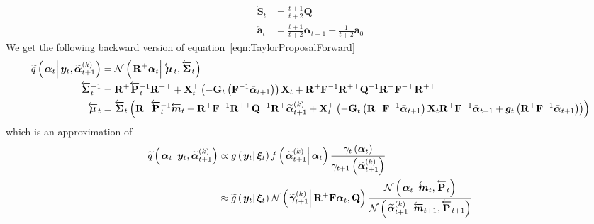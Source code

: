 \documentclass[9pt, notitlepage]{article}
\renewcommand{\vec}[1]{\bm{#1}}
\newcommand{\vecb}[1]{\bar{\vec{#1}}}
\newcommand{\vecLarrow}[1]{\overleftarrow{\vec{#1}}}
\newcommand{\mat}[1]{\mathbf{#1}}
\newcommand{\matLarrow}[1]{\overleftarrow{\mat{#1}}}
\newcommand{\Lparen}[1]{\left( #1\right)}
\newcommand{\Cond}[2]{\left. #1 \vphantom{#2} \right\vert  #2}
\newcommand{\optor}[2]{#1\Lparen{#2}}
\newcommand{\optorC}[3]{\optor{#1}{\Cond{#2}{#3}}}
\newcommand{\normalC}[3]{\optorC{\mathcal{N}}{#1}{#2,#3}}
\newcommand{\IDAproxC}[2]{\optorC{\widetilde{q}}{#1}{#2}}
\newcommand{\particB}[3]{\widetilde{#1}_{#2}^{\Lparen{#3}}}
\begin{document}
%
\begin{equation}\begin{split}\label{eqn:FirstOrderStrange}
	\matLarrow{S}_t &= \frac{t +1}{t + 2} \mat{Q} \\
%
	\vecLarrow{a}_t &= %
		\frac{t + 1}{t + 2}\vec{\alpha}_{t+1} +
		\frac{1}{ t+ 2} \vec{a}_0
\end{split}\end{equation}
%
%
We get the following backward version of equation~\eqref{eqn:TaylorProposalForward}%
%
{\scriptsize%
\begin{equation}\begin{split}\label{eqn:bw_approx}
	\IDAproxC{\vec{\alpha}_t}{\vec{y}_t, \particB{\vec{\alpha}}{t + 1}{k}} &=   %
		\normalC{\mat{R}^+\vec{\alpha}_t}{\vecLarrow{\mu}_t}{\matLarrow{\Sigma}_t} \\
%
	\matLarrow{\Sigma}_t^{-1} &=
		\mat{R}^{+}\matLarrow{P}_t^{-1}\mat{R}^{+\top} +
		\mat{X}_t^\top\Lparen{-\mat{G}_t\Lparen{\mat{F}^{-1}\vecb{\alpha}_{t + 1}}}
		\mat{X}_t + 
		\mat{R}^{+}\mat{F}^{-1}\mat{R}^{+\top}\mat{Q}^{-1}
		\mat{R}^{+}\mat{F}^{-\top}\mat{R}^{+\top}  \\
%
	\vecLarrow{\mu}_t
	 &= \matLarrow{\Sigma}_t \Lparen{
		\mat{R}^{+}\matLarrow{P}_t^{-1}\vecLarrow{m}_t +
		\mat{R}^{+}\mat{F}^{-1}\mat{R}^{+\top}
		\mat{Q}^{-1}\mat{R}^{+}\particB{\vec{\alpha}}{t + 1}{k} +
		\mat{X}_t^\top
		\Lparen{
			-\mat{G}_t\Lparen{\mat{R}^{+}\mat{F}^{-1}\vecb{\alpha}_{t + 1}}
			\mat{X}_t\mat{R}^{+}\mat{F}^{-1}\vecb{\alpha}_{t + 1} +
			\vec{g}_t\Lparen{\mat{R}^{+}\mat{F}^{-1}\vecb{\alpha}_{t + 1}}
		}}
\end{split}\end{equation}
}%
%
which is an approximation of%
%
\begin{equation}\begin{split}
	\IDAproxC{\vec{\alpha}_t}{\vec{y}_t, \particB{\vec{\alpha}}{t + 1}{k}} & \propto
		\optorC{g}{\vec{y}_t}{\vec{\xi}_t}
		\optorC{f}{\particB{\vec{\alpha}}{t + 1}{k}}{\vec{\alpha}_t}
		\frac{\gamma_t\Lparen{\vec{\alpha}_t}}{\gamma_{t + 1}\Lparen{\particB{\vec{\alpha}}{t + 1}{k}}} \\
%
	& \approx \optorC{\widetilde{g}}{\vec{y}_t}{\vec{\xi}_t}
		\normalC{\particB{\vec{\gamma}}{t + 1}{k}}{\mat{R}^+\mat{F}\vec{\alpha}_t}{\mat{Q}}
		\frac{
			\normalC{\vec{\alpha}_t}{\vecLarrow{m}_t}{\matLarrow{P}_t}
		}{ %
			\normalC{\particB{\vec{\alpha}}{t + 1}{k}}{\vecLarrow{m}_{t + 1}}{\matLarrow{P}_{t + 1}}
		}
\end{split}\end{equation}
\end{document}
